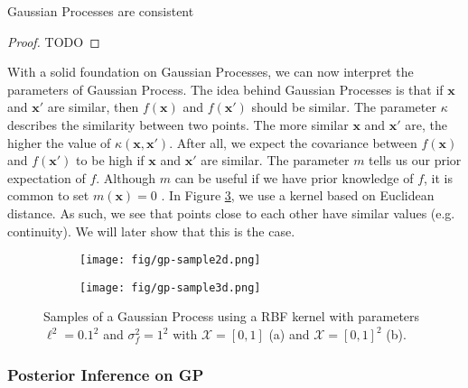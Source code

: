 \begin{theorem}\label{thm:kol-ext}
    
\end{theorem}

\begin{theorem}\label{thm:gp-const}
    Gaussian Processes are consistent
\end{theorem}
\begin{proof}
    TODO
\end{proof}


With a solid foundation on Gaussian Processes, we can now interpret the parameters of Gaussian Process.
The idea behind Gaussian Processes is that if $\mathbf{x}$ and $\mathbf{x}'$ are similar, then
$f(\mathbf{x})$ and $f(\mathbf{x}')$ should be similar.
The parameter $\kappa$ describes the similarity between two points.
The more similar $\mathbf{x}$ and $\mathbf{x}'$ are, the higher the value of $\kappa(\mathbf{x}, \mathbf{x}')$.
After all, we expect the covariance between $f(\mathbf{x})$ and $f(\mathbf{x}')$
to be high if $\mathbf{x}$ and $\mathbf{x}'$ are similar.
The parameter $m$ tells us our prior expectation of $f$.
Although $m$ can be useful if we have prior knowledge of $f$, it is common to set $m(\mathbf{x}) = 0$ \cite{murphy2012}.
In Figure \ref{fig:gp-sample}, we use a kernel based on Euclidean distance.
As such, we see that points close to each other have similar values (e.g. continuity).
We will later show that this is the case.

\begin{figure}
     \centering
     \begin{subfigure}[b]{0.45\textwidth}
         \centering
         \texttt{[image: fig/gp-sample2d.png]}
         \caption{}
         \label{subfig:2d-gp-sample}
     \end{subfigure}
     \hfill
     \begin{subfigure}[b]{0.45\textwidth}
         \centering
         \texttt{[image: fig/gp-sample3d.png]}
         \caption{}
         \label{subfig:3d-gp-sample}
     \end{subfigure}
     \hfill
    \caption{Samples of a Gaussian Process using a RBF kernel with parameters $\ell^{2} = 0.1^2$ and $\sigma^{2}_f = 1 ^ 2$ with
        $\mathcal{X} = [0, 1]$ (a) and $\mathcal{X} = [0, 1]^2$ (b).
    }
    \label{fig:gp-sample}
\end{figure}

\subsubsection{Posterior Inference on GP}

